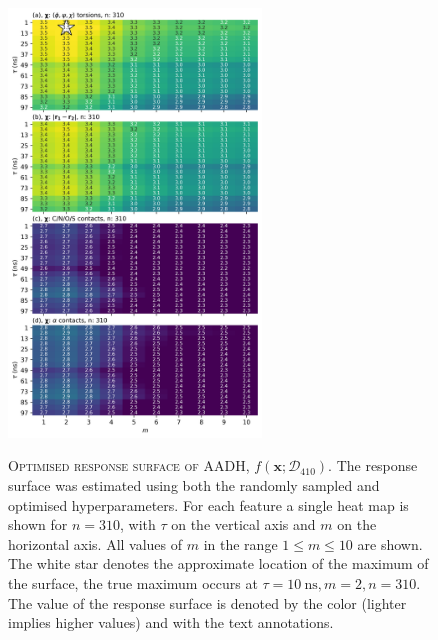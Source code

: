 \begin{figure}
    \centering
    \caption[Optimised response surface of AADH]{\textsc{Optimised response surface of AADH, $f\left(\mathbf{x}; \mathcal{D}_{410}\right)$}. The response surface was estimated using both the randomly sampled and optimised hyperparameters. For each feature a single heat map is shown for $n=310$, with $\tau$ on the vertical axis and $m$ on the horizontal axis. All values of $m$ in the range $1\le m \le 10$ are shown. The white star denotes the approximate location of the maximum of the surface, the true maximum occurs at $\tau=\SI{10}{\nano\second}, m=2, n=310$. The value of the response surface is denoted by the color (lighter implies higher values) and with the text annotations.}
    \includegraphics[width=0.6\textwidth]{chapters/msm_optimization/figures/aadh_response_surface_d_opt.png}
    \label{fig:aadh_rsm_opt}
\end{figure}


